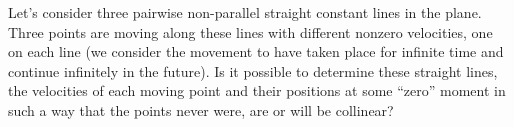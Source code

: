 Let’s consider three pairwise non-parallel straight constant lines in the plane. Three points are moving along these lines with different nonzero velocities, one on each line (we consider the movement to have taken place for infinite time and continue infinitely in the future). Is it possible to determine these straight lines, the velocities of each moving point and their positions at some “zero” moment in such a way that the points never were, are or will be collinear?